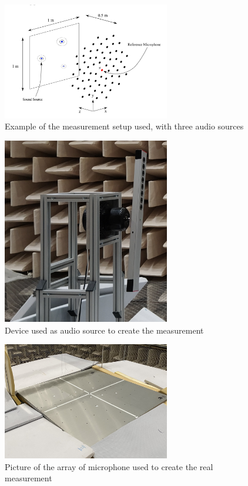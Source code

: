 \documentclass{article}
\begin{document}
\begin{figure}
    \centering
    \includegraphics[width=0.65\textwidth]{../figs/full_measurement_setup.png}
    \caption{Example of the measurement setup used, with three audio sources}
    \label{fig:full_measurement_setup}
\end{figure} 

\begin{figure}
    \centering
    \includegraphics[width=0.65\textwidth]{../figs/source.png}
    \caption{Device used as audio source to create the measurement}
    \label{fig:source}
\end{figure}

\begin{figure}
    \centering
    \includegraphics[width=0.65\textwidth]{../figs/microphone_array_cropped.jpg}
    \caption{Picture of the array of microphone used to create the real measurement}
    \label{fig:microphone_array}
\end{figure}
\end{document}
